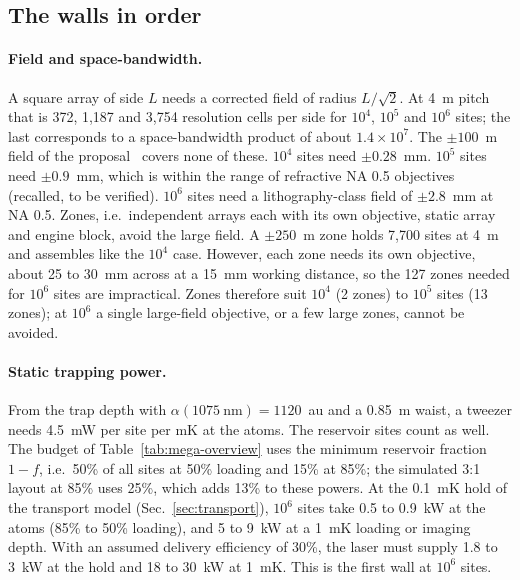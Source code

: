 \subsection{The walls in order}\label{sec:megascale-walls}

\paragraph{Field and space-bandwidth.} A square array of side $L$ needs a corrected field of radius $L/\sqrt{2}$. At 4~\textmu m pitch that is 372, 1,187 and 3,754 resolution cells per side for $10^4$, $10^5$ and $10^6$ sites; the last corresponds to a space-bandwidth product of about $1.4\times10^7$. The $\pm100$~\textmu m field of the proposal~\cite{proposal} covers none of these. $10^4$ sites need $\pm0.28$~mm. $10^5$ sites need $\pm0.9$~mm, which is within the range of refractive NA 0.5 objectives (recalled, to be verified). $10^6$ sites need a lithography-class field of $\pm2.8$~mm at NA 0.5. Zones, i.e.\ independent arrays each with its own objective, static array and engine block, avoid the large field. A $\pm250$~\textmu m zone holds 7,700 sites at 4~\textmu m and assembles like the $10^4$ case. However, each zone needs its own objective, about 25 to 30~mm across at a 15~mm working distance, so the 127 zones needed for $10^6$ sites are impractical. Zones therefore suit $10^4$ (2 zones) to $10^5$ sites (13 zones); at $10^6$ a single large-field objective, or a few large zones, cannot be avoided.

\paragraph{Static trapping power.} From the trap depth with $\alpha(1075~\mathrm{nm})=1120$~au and a 0.85~\textmu m waist, a tweezer needs 4.5~mW per site per mK at the atoms. The reservoir sites count as well. The budget of Table~\ref{tab:mega-overview} uses the minimum reservoir fraction $1-f$, i.e.\ 50\% of all sites at 50\% loading and 15\% at 85\%; the simulated 3:1 layout at 85\% uses 25\%, which adds 13\% to these powers. At the 0.1~mK hold of the transport model (Sec.~\ref{sec:transport}), $10^6$ sites take 0.5 to 0.9~kW at the atoms (85\% to 50\% loading), and 5 to 9~kW at a 1~mK loading or imaging depth. With an assumed delivery efficiency of 30\%, the laser must supply 1.8 to 3~kW at the hold and 18 to 30~kW at 1~mK. This is the first wall at $10^6$ sites.

